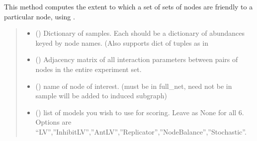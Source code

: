 \documentclass[letterpaper,10pt,english]{sphinxmanual}
\begin{document}
\begin{fulllineitems}
\label{\detokenize{scoring:score_net.network_friendliness}}
\pysigstartsignatures
{}
\pysigstopsignatures
\sphinxAtStartPar
This method computes the extent to which a set of sets of nodes are friendly to a particular node, using .
\begin{quote}\begin{description}
\begin{itemize}
\item {} 
\sphinxAtStartPar
{} (\sphinxstyleliteralemphasis{\sphinxupquote{{[}}}\sphinxstyleliteralemphasis{\sphinxupquote{{[}}}\sphinxstyleliteralemphasis{\sphinxupquote{{]}}}\sphinxstyleliteralemphasis{\sphinxupquote{{]}}}) \textendash{} Dictionary of samples. Each should be a dictionary of abundances keyed by node names. (Also supports dict of tuples as in {\hyperref[\detokenize{scoring:score_net.score_net}]{}}

\item {} 
\sphinxAtStartPar
{} () \textendash{} Adjacency matrix of all interaction parameters between pairs of nodes in the entire experiment set.

\item {} 
\sphinxAtStartPar
{} () \textendash{} name of node of interest. (must be in full\_net, need not be in sample \sphinxhyphen{} will be added to induced subgraph)

\item {} 
\sphinxAtStartPar
{} () \textendash{} list of models you wish to use for scoring. Leave as None for all 6. Options are “LV”,”InhibitLV”,”AntLV”,”Replicator”,”NodeBalance”,”Stochastic”.


\end{itemize}
\end{description}
\end{quote}
\end{fulllineitems}
\end{document}
